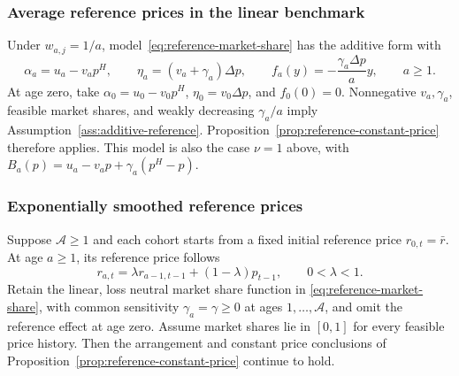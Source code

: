 \subsubsection{Average reference prices in the linear benchmark}
Under \(w_{a,j}=1/a\), model~\eqref{eq:reference-market-share} has the additive form with
\[
 \alpha_a=u_a-v_ap^H,\qquad
 \eta_a=(v_a+\gamma_a)\Delta p,\qquad
 f_a(y)=-\frac{\gamma_a\Delta p}{a}y,\qquad a\ge1.
\]
At age zero, take \(\alpha_0=u_0-v_0p^H\), \(\eta_0=v_0\Delta p\), and \(f_0(0)=0\). Nonnegative \(v_a,\gamma_a\), feasible market shares, and weakly decreasing \(\gamma_a/a\) imply Assumption~\ref{ass:additive-reference}. Proposition~\ref{prop:reference-constant-price} therefore applies. This model is also the case \(\nu=1\) above, with \(B_a(p)=u_a-v_ap+\gamma_a(p^H-p)\).
\par\endgroup

\subsubsection{Exponentially smoothed reference prices}
\hypertarget{proof-exponential-reference}{}
Suppose \(\mathcal A\ge1\) and each cohort starts from a fixed initial reference price \(r_{0,t}=\bar r\). At age \(a\ge1\), its reference price follows
\[
 r_{a,t}=\lambda r_{a-1,t-1}+(1-\lambda)p_{t-1},
 \qquad 0<\lambda<1.
\]
Retain the linear, loss neutral market share function in \eqref{eq:reference-market-share}, with common sensitivity \(\gamma_a=\gamma\ge0\) at ages \(1,\ldots,\mathcal A\), and omit the reference effect at age zero. Assume market shares lie in \([0,1]\) for every feasible price history. Then the arrangement and constant price conclusions of Proposition~\ref{prop:reference-constant-price} continue to hold.

